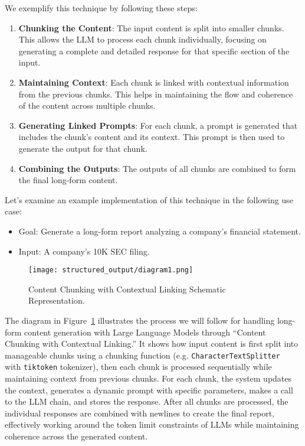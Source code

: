 We exemplify this technique by following these steps:
\begin{enumerate}
\item \textbf{Chunking the Content}: The input content is split into smaller chunks. This allows the LLM to process each chunk individually, focusing on generating a complete and detailed response for that specific section of the input.

\item \textbf{Maintaining Context}: Each chunk is linked with contextual information from the previous chunks. This helps in maintaining the flow and coherence of the content across multiple chunks.

\item \textbf{Generating Linked Prompts}: For each chunk, a prompt is generated that includes the chunk's content and its context. This prompt is then used to generate the output for that chunk.

\item \textbf{Combining the Outputs}: The outputs of all chunks are combined to form the final long-form content.
\end{enumerate}

Let's examine an example implementation of this technique in the following use case:
\begin{itemize}
\item Goal: Generate a long-form report analyzing a company's financial statement.
\item Input: A company's 10K SEC filing.
\end{itemize}

\begin{figure}[H]
\centering
\texttt{[image: structured\_output/diagram1.png]}
\caption{Content Chunking with Contextual Linking Schematic Representation.}
\label{content-chunking-with-contextual-linking}
\end{figure}

The diagram in Figure~\ref{content-chunking-with-contextual-linking} illustrates the process we will follow for handling long-form content generation with Large Language Models through ``Content Chunking with Contextual Linking.'' It shows how input content is first split into manageable chunks using a chunking function (e.g. \texttt{CharacterTextSplitter}~ with \texttt{tiktoken} tokenizer), then each chunk is processed sequentially while maintaining context from previous chunks. For each chunk, the system updates the context, generates a dynamic prompt with specific parameters, makes a call to the LLM chain, and stores the response. After all chunks are processed, the individual responses are combined with newlines to create the final report, effectively working around the token limit constraints of LLMs while maintaining coherence across the generated content.
